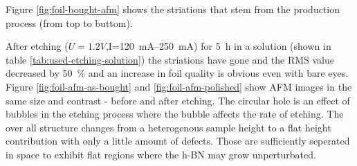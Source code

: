 Figure \ref{fig:foil-bought-afm} shows the striations that stem from the production process (from top to buttom).

After etching ($U=1.2V$,I=\SIrange{120}{250}{\mA}) for \SI{5}{\hour} in a solution (shown in table \ref{tab:used-etching-solution}) the striations have gone and the RMS value decreased by \SI{50}{\percent} and an increase in foil quality is obvious even with bare eyes. Figure \ref{fig:foil-afm-as-bought} and \ref{fig:foil-afm-polished} show AFM images in the same size and contrast - before and after etching.
The circular hole is an effect of bubbles in the etching process where the bubble affects the rate of etching. The over all structure changes from a heterogenous sample height to a flat height contribution with only a little amount of defects. Those are sufficiently seperated in space to exhibit flat regions where the h-BN may grow unperturbated.
%
%

